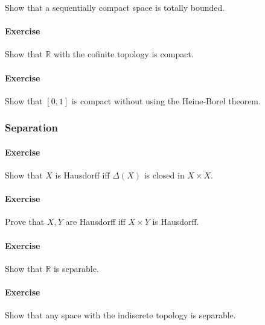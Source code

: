 Show that a sequentially compact space is totally bounded.

\hypertarget{exercise-31}{%
\paragraph{Exercise}\label{exercise-31}}

Show that \({\mathbb{R}}\) with the cofinite topology is compact.

\hypertarget{exercise-32}{%
\paragraph{Exercise}\label{exercise-32}}

Show that \([0, 1]\) is compact without using the Heine-Borel theorem.

\hypertarget{separation}{%
\subsubsection{Separation}\label{separation}}

\hypertarget{exercise-33}{%
\paragraph{Exercise}\label{exercise-33}}

Show that \(X\) is Hausdorff iff \(\Delta(X)\) is closed in
\(X\times X\).

\hypertarget{exercise-34}{%
\paragraph{Exercise}\label{exercise-34}}

Prove that \(X, Y\) are Hausdorff iff \(X\times Y\) is Hausdorff.

\hypertarget{exercise-35}{%
\paragraph{Exercise}\label{exercise-35}}

Show that \({\mathbb{R}}\) is separable.

\hypertarget{exercise-36}{%
\paragraph{Exercise}\label{exercise-36}}

Show that any space with the indiscrete topology is separable.


